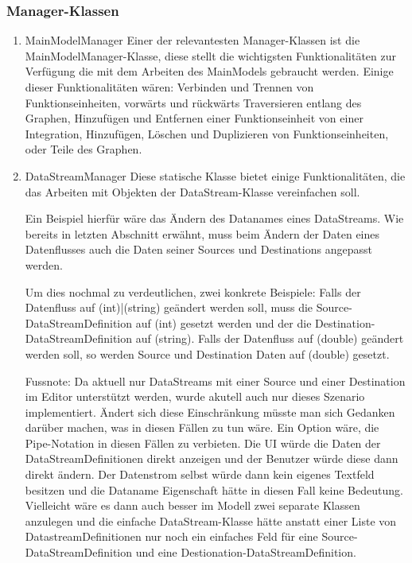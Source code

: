 \documentclass[11pt]{article}
\begin{document}
\subsubsection{Manager-Klassen}
\label{sec:orgheadline13}
\begin{enumerate}
\item MainModelManager
\label{sec:orgheadline11}
Einer der relevantesten Manager-Klassen ist die MainModelManager-Klasse,
diese stellt die wichtigsten Funktionalitäten zur Verfügung die mit dem
Arbeiten des MainModels gebraucht werden. Einige dieser Funktionalitäten
wären: Verbinden und Trennen von Funktionseinheiten, vorwärts und rückwärts
Traversieren entlang des Graphen, Hinzufügen und Entfernen einer
Funktionseinheit von einer Integration, Hinzufügen, Löschen und Duplizieren
von Funktionseinheiten, oder Teile des Graphen.

\item DataStreamManager
\label{sec:orgheadline12}
Diese statische Klasse bietet einige Funktionalitäten, die das Arbeiten mit
Objekten der DataStream-Klasse vereinfachen soll.

Ein Beispiel hierfür wäre das Ändern des Datanames eines DataStreams. 
Wie bereits in letzten Abschnitt erwähnt, muss beim Ändern der Daten
eines Datenflusses auch die Daten seiner Sources und Destinations
angepasst werden. 

Um dies nochmal zu verdeutlichen, zwei konkrete Beispiele:
Falls der Datenfluss auf (int)|(string) geändert werden
soll, muss die Source-DataStreamDefinition auf (int) gesetzt werden und der
die Destination-DataStreamDefinition auf (string). 
Falls der Datenfluss auf (double) geändert werden soll, so werden Source
und Destination Daten auf (double) gesetzt.

Fussnote: Da aktuell nur DataStreams mit einer Source und einer Destination im Editor unterstützt
werden, wurde akutell auch nur dieses Szenario implementiert. Ändert sich
diese Einschränkung müsste man sich Gedanken darüber machen, was in diesen
Fällen zu tun wäre. Ein Option wäre, die Pipe-Notation in diesen Fällen zu
verbieten. Die UI würde die Daten der DataStreamDefinitionen direkt
anzeigen und der Benutzer würde diese dann direkt ändern. Der Datenstrom
selbst würde dann kein eigenes Textfeld besitzen und die Dataname
Eigenschaft hätte in diesen Fall keine Bedeutung. 
Vielleicht wäre es dann auch besser im Modell zwei separate Klassen
anzulegen und die
einfache DataStream-Klasse hätte anstatt einer Liste von DatastreamDefinitionen nur noch ein einfaches Feld
für eine Source-DataStreamDefinition und eine Destionation-DataStreamDefinition.


\end{enumerate}
\end{document}
